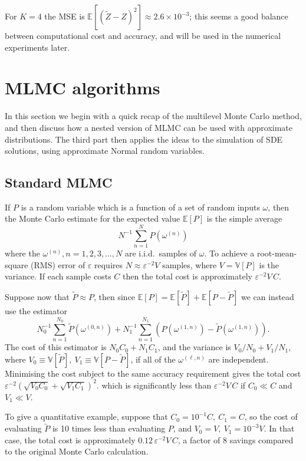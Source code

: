 \documentclass[11pt]{article}
\def \EE {{\mathbb{E}}}
\def \VV {{\mathbb{V}}}
\def \tP {{\widetilde{P}}}
\def \tZ {{\widetilde{Z}}}
\def\eps{{\varepsilon}}
\begin{document}
For $K\!=\!4$ the MSE is $\EE[(\tZ{-}Z)^2]\!\approx\! 2.6 \!\times\!10^{-3}$;
this seems a good balance between computational cost and accuracy,
and will be used in the numerical experiments later.


\section{MLMC algorithms}

In this section we begin with a quick recap of the multilevel Monte Carlo
method, and then discuss how a nested version of MLMC can be used with
approximate distributions. The third part then applies the ideas to the
simulation of SDE solutions, using approximate Normal random variables.

\subsection{Standard MLMC}

\label{sec:standard_MLMC}

If $P$ is a random variable which is a function of a set of random inputs
$\omega$, then the Monte Carlo estimate for the expected value $\EE[P]$ is
the simple average
\[
N^{-1} \sum_{n=1}^N P(\omega^{(n)})
\]
where the $\omega^{(n)}, n\!=\!1, 2, 3, \ldots, N$ are i.i.d.~samples of $\omega$.
To achieve a root-mean-square (RMS) error of $\eps$ requires
$\displaystyle
N \!\approx\! \eps^{-2} V
$
samples, where $V \!=\! \VV[P]$ is the variance.  If each sample costs $C$
then the total cost is approximately $\eps^{-2} V \, C$.

Suppose now that $\tP \approx P$, then since
$\displaystyle \EE[P] = \EE[\tP] + \EE[P{-} \tP]$
we can instead use the estimator
\[
N_0^{-1} \sum_{n=1}^{N_0} \tP(\omega^{(0,n)}) + 
N_1^{-1} \sum_{n=1}^{N_1} (P(\omega^{(1,n)}) - \tP(\omega^{(1,n)})).
\]
The cost of this estimator is $N_0 C_0 + N_1 C_1$, and 
the variance is $V_0 / N_0 + V_1 / N_1$, where
$V_0\equiv \VV[\tP], ~ V_1\equiv \VV[P{-}\tP]$, if all of 
the $\omega^{(\ell,n)}$ are independent.
Minimising the cost subject to the same accuracy requirement 
gives the total cost
$\displaystyle
\eps^{-2} (\sqrt{V_0C_0} + \sqrt{V_1C_1})^2.
$
which is significantly less than $\eps^{-2} V \, C$ if $C_0\ll C$ and $V_1\ll V$.

To give a quantitative example, suppose that
$C_0 \!=\! 10^{-1} C,\ C_1 \!=\! C$, so the cost of evaluating $\tP$ is
10 times less than evaluating $P$, and
$V_0 \!=\! V,\ V_1 \!=\! 10^{-3} V$.
In that case, the total cost is approximately $0.12\, \eps^{-2} V\, C$,
a factor of 8 savings compared to the original Monte Carlo calculation.
\end{document}
